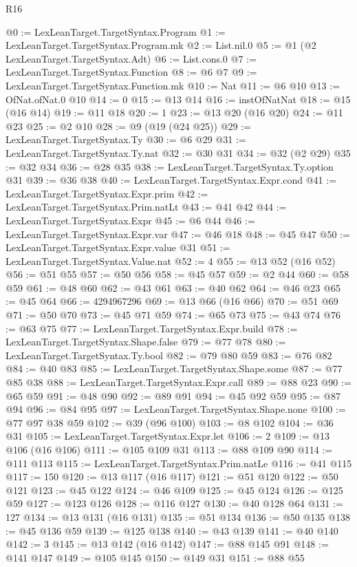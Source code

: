 \begin{lexlean}{R16}
\begin{coremodule}
@0 := LexLeanTarget.TargetSyntax.Program
@1 := LexLeanTarget.TargetSyntax.Program.mk
@2 := List.nil.{0}
@5 := @1 (@2 LexLeanTarget.TargetSyntax.Adt)
@6 := List.cons.{0}
@7 := LexLeanTarget.TargetSyntax.Function
@8 := @6 @7
@9 := LexLeanTarget.TargetSyntax.Function.mk
@10 := Nat
@11 := @6 @10
@13 := OfNat.ofNat.{0} @10
@14 := 0
@15 := @13 @14
@16 := instOfNatNat
@18 := @15 (@16 @14)
@19 := @11 @18
@20 := 1
@23 := @13 @20 (@16 @20)
@24 := @11 @23
@25 := @2 @10
@28 := @9 (@19 (@24 @25))
@29 := LexLeanTarget.TargetSyntax.Ty
@30 := @6 @29
@31 := LexLeanTarget.TargetSyntax.Ty.nat
@32 := @30 @31
@34 := @32 (@2 @29)
@35 := @32 @34
@36 := @28 @35
@38 := LexLeanTarget.TargetSyntax.Ty.option @31
@39 := @36 @38
@40 := LexLeanTarget.TargetSyntax.Expr.cond
@41 := LexLeanTarget.TargetSyntax.Expr.prim
@42 := LexLeanTarget.TargetSyntax.Prim.natLt
@43 := @41 @42
@44 := LexLeanTarget.TargetSyntax.Expr
@45 := @6 @44
@46 := LexLeanTarget.TargetSyntax.Expr.var
@47 := @46 @18
@48 := @45 @47
@50 := LexLeanTarget.TargetSyntax.Expr.value @31
@51 := LexLeanTarget.TargetSyntax.Value.nat
@52 := 4
@55 := @13 @52 (@16 @52)
@56 := @51 @55
@57 := @50 @56
@58 := @45 @57
@59 := @2 @44
@60 := @58 @59
@61 := @48 @60
@62 := @43 @61
@63 := @40 @62
@64 := @46 @23
@65 := @45 @64
@66 := 4294967296
@69 := @13 @66 (@16 @66)
@70 := @51 @69
@71 := @50 @70
@73 := @45 @71 @59
@74 := @65 @73
@75 := @43 @74
@76 := @63 @75
@77 := LexLeanTarget.TargetSyntax.Expr.build
@78 := LexLeanTarget.TargetSyntax.Shape.false
@79 := @77 @78
@80 := LexLeanTarget.TargetSyntax.Ty.bool
@82 := @79 @80 @59
@83 := @76 @82
@84 := @40 @83
@85 := LexLeanTarget.TargetSyntax.Shape.some
@87 := @77 @85 @38
@88 := LexLeanTarget.TargetSyntax.Expr.call
@89 := @88 @23
@90 := @65 @59
@91 := @48 @90
@92 := @89 @91
@94 := @45 @92 @59
@95 := @87 @94
@96 := @84 @95
@97 := LexLeanTarget.TargetSyntax.Shape.none
@100 := @77 @97 @38 @59
@102 := @39 (@96 @100)
@103 := @8 @102
@104 := @36 @31
@105 := LexLeanTarget.TargetSyntax.Expr.let
@106 := 2
@109 := @13 @106 (@16 @106)
@111 := @105 @109 @31
@113 := @88 @109 @90
@114 := @111 @113
@115 := LexLeanTarget.TargetSyntax.Prim.natLe
@116 := @41 @115
@117 := 150
@120 := @13 @117 (@16 @117)
@121 := @51 @120
@122 := @50 @121
@123 := @45 @122
@124 := @46 @109
@125 := @45 @124
@126 := @125 @59
@127 := @123 @126
@128 := @116 @127
@130 := @40 @128 @64
@131 := 127
@134 := @13 @131 (@16 @131)
@135 := @51 @134
@136 := @50 @135
@138 := @45 @136 @59
@139 := @125 @138
@140 := @43 @139
@141 := @40 @140
@142 := 3
@145 := @13 @142 (@16 @142)
@147 := @88 @145 @91
@148 := @141 @147
@149 := @105 @145
@150 := @149 @31
@151 := @88 @55

\end{coremodule}
\end{lexlean}
